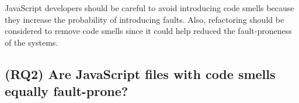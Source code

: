 \documentclass[smallcondensed]{svjour3}
\begin{document}
{\color{blue}JavaScript developers should be careful to avoid introducing code smells because they increase the probability of introducing faults. Also, refactoring should be considered to remove code smells since it could help reduced the fault-proneness of the systems.}

\subsection*{(RQ2) Are JavaScript files with code smells equally fault-prone?}

\end{document}
